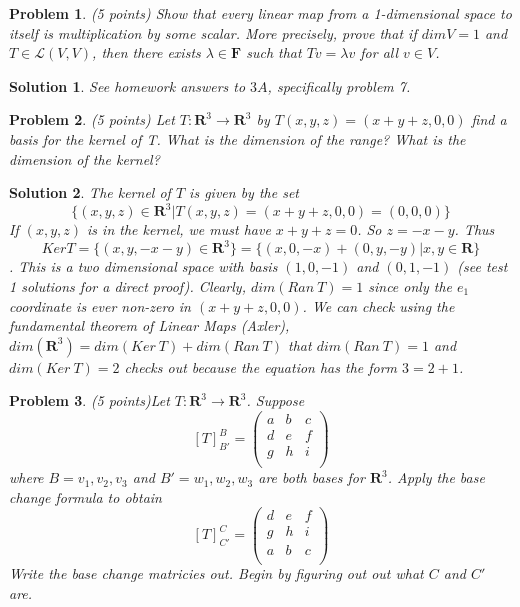 \documentclass{article}
\theoremstyle{problemstyle}
\newtheorem{problem}{Problem}
\theoremstyle{problemstyle}
\newtheorem{solution}{Solution}
\theoremstyle{problemstyle}
\begin{document}
\begin{problem}
(5 points) Show that every linear map from a 1-dimensional space to itself is multiplication by some scalar. More precisely, prove that if $dim V = 1$ and $T \in \mathscr{L}(V,V)$, then there exists $\lambda \in \textbf{F}$ such that $Tv = \lambda v$ for all $v \in V$. 
\end{problem}

\begin{solution}
See homework answers to $3A$, specifically problem 7. 
\end{solution}

\begin{problem}
(5 points) Let $T:\textbf{R}^3 \rightarrow \textbf{R}^3$ by $T(x,y,z) = (x+y+z,0,0)$ find a basis for the kernel of T. What is the dimension of the range? What is the dimension of the kernel?
\end{problem}

\begin{solution}
The kernel of $T$ is given by the set $$\{(x,y,z) \in \textbf{R}^3|T(x,y,z) = (x+y+z,0,0) = (0,0,0)\}$$ If $(x,y,z)$ is in the kernel, we must have $x + y + z = 0$. So $z = -x-y$. Thus $$Ker T = \{(x,y,-x-y) \in \textbf{R}^3\} = \{(x,0,-x)+(0,y,-y)|x,y \in \textbf{R}\}$$. This is a two dimensional space with basis $(1,0,-1)$ and $(0,1,-1)$ (see test 1 solutions for a direct proof).  Clearly, $dim(Ran \  T) = 1$ since only the $e_1$ coordinate is ever non-zero in $(x+y+z,0,0)$.  We can check using the fundamental theorem of Linear Maps (Axler), $dim(\textbf{R}^3) = dim(Ker \ T) + dim(Ran \ T)$ that $dim(Ran \ T) = 1$ and $dim( Ker\ T) = 2$ checks out because the equation has the form $3 = 2 + 1$. 
\end{solution}

\begin{problem}
(5 points)Let $T:\textbf{R}^3 \rightarrow \textbf{R}^3$. Suppose 
$$[T]^{B}_{B'} = 
\begin{pmatrix} a & b & c  \\
 d & e& f   \\
  g & h& i   \\
\end{pmatrix}$$ 
where $B = v_1,v_2,v_3$ and $B' = w_1,w_2,w_3$ are both bases for $\textbf{R}^3$. Apply the base change formula to obtain $$[T]^{C}_{C'} = 
\begin{pmatrix} 
 d & e & f   \\
 g & h & i   \\
 a & b & c  \\
\end{pmatrix}$$ 
Write the base change matricies out. Begin by figuring out out what $C$ and $C'$ are. 
\end{problem}
\end{document}
